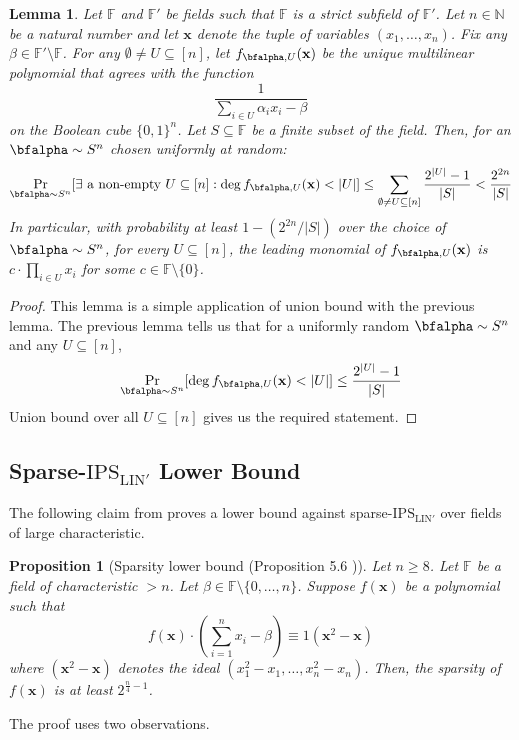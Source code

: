 \documentclass[11pt]{article}
\newtheorem{lemma}[theorem]{Lemma}
\newtheorem{proposition}[theorem]{Proposition}
\newcommand{\Boo}{\{0,1 \}}
\newcommand{\F}{\mathbb{F}}
\newcommand{\IPSLINp}{\mathrm{IPS}_{\mathrm{LIN}'}}
\begin{document}
\begin{lemma}\label{lem: deg lower bound union bound}
    Let $\F$ and $\F'$ be fields such that $\F$ is a strict subfield of $\F'$. Let $n\in \mathbb{N}$ be a natural number and let $\mathbf{x}$ denote the tuple of variables $(x_1, \dots, x_n)$. Fix any $\beta \in \F'\setminus \F$. For any $\emptyset \neq U \subseteq [n]$, let $f_{\bfalpha,U}(\mathbf{x})$ be the unique multilinear polynomial that agrees with the function $$\frac{1}{\sum_{i\in U}{\alpha_ix_i}-\beta}$$ on the Boolean cube $\Boo^n$.
    Let $S \subseteq \F$ be a finite subset of the field.
    Then, for an $\bfalpha \sim S^n$ chosen uniformly at random: $$\Pr_{\bfalpha \sim S^n}[\exists \text{ a non-empty } U\subseteq [n]:\deg{f_{\bfalpha,U}(\mathbf{x})} < |U|] \leq \sum_{\emptyset \neq U\subseteq [n]}\frac{2^{|U|}-1}{|S|} < \frac{2^{2n}}{|S|}$$
    In particular, with probability at least $1-(2^{2n}/|S|)$ over the choice of $\bfalpha \sim S^n$, for every $U \subseteq [n]$, the leading monomial of $f_{\bfalpha,U}(\mathbf{x})$ is $c\cdot\prod_{i\in U}x_i$ for some $c\in\F\setminus\{0\}$. 
\end{lemma}
\begin{proof}
    This lemma is a simple application of union bound with the previous lemma. The previous lemma tells us that for a uniformly random $\bfalpha \sim S^n$ and any $U\subseteq [n]$, $$\Pr_{\bfalpha \sim S^n}[\deg{f_{\bfalpha,U}(\mathbf{x})} < |U|] \leq \frac{2^{|U|} - 1}{|S|}$$
    Union bound over all $U\subseteq [n]$ gives us the required statement.
\end{proof}

\subsection{Sparse-$\IPSLINp$ Lower Bound}
The following claim from \cite{FSTW21} proves a lower bound against sparse-$\IPSLINp$ over fields of large characteristic. 
\begin{proposition}[Sparsity lower bound (Proposition 5.6 \cite{FSTW21})]
    Let $n \geq 8$. Let $\F$ be a field of characteristic $> n$. Let $\beta \in \F\setminus\{0,\dots, n\}$. Suppose $f(\mathbf{x})$ be a polynomial such that $$f(\mathbf{x}) \cdot \left (\sum_{i=1}^{n}{x_i} - \beta \right) \equiv 1 \left({\mathbf{x}^2 - \mathbf{x}} \right )$$ where $\left({\mathbf{x}^2 - \mathbf{x}} \right)$ denotes the ideal $(x_1^2-x_1, \dots, x_n^2 - x_n)$.
    Then, the sparsity of $f(\mathbf{x})$ is at least $2^{\frac{n}{4} -  1}$.
\end{proposition}
The proof uses two observations.
\end{document}
